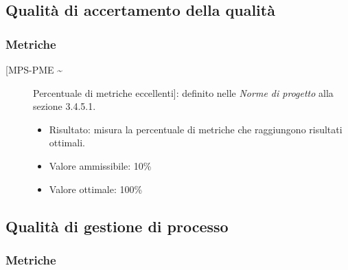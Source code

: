 \documentclass[../piano-di-qualifica.tex]{subfiles}
\begin{document}


\subsection{Qualità di accertamento della qualità}%
\label{subsec:qualita_accertamento_qualita}

\subsubsection{Metriche}%
\label{subsec:metriche_aq}

\begin{description}
  \item [[MPS-PME \textasciitilde] Percentuale di metriche eccellenti]: definito nelle \textit{Norme di progetto} alla sezione 3.4.5.1.
        \begin{itemize} \item Risultato: misura la percentuale di metriche che raggiungono risultati ottimali. \item Valore ammissibile: 10\% \item Valore ottimale: 100\%  \end{itemize}
\end{description}

\subsection{Qualità di gestione di processo}%
\label{subsec:qualita_processo}

\subsubsection{Metriche}%
\label{subsec:metriche_pr}
\end{document}
